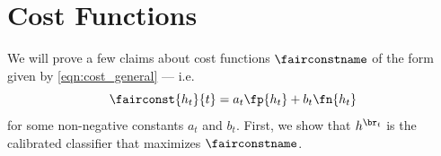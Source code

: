 \section{Cost Functions}
\label{app:cost-funcs}

We will prove a few claims about cost functions
$\fairconstname$ of the form given by \eqref{eqn:cost_general} ---
i.e.
%
\[ \fairconst{h_t}{t} = a_t \fp{h_t} + b_t \fn{h_t} \]
for some non-negative constants $a_t$ and $b_t$.
First, we show that $h^{\br_t}$ is the calibrated classifier that maximizes
$\fairconstname$.


